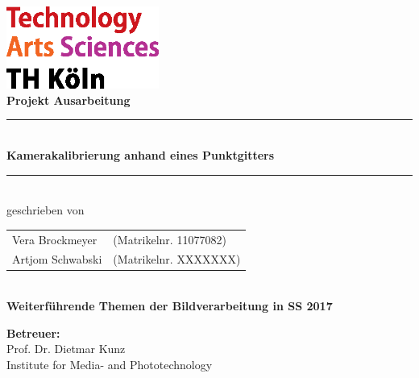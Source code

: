 \thispagestyle{empty}
\begin{center}
	\includegraphics[width=5cm]{Images/logo_TH}\\[12ex]
	{\Huge\textbf{Projekt Ausarbeitung}}\\[8ex]
	\rule{.8\textwidth}{.2pt}
	{\Large\\[1ex] \textbf{Kamerakalibrierung anhand eines Punktgitters }}\\
	\rule{.8\textwidth}{.2pt}\\[10ex]
	geschrieben von\\[2ex]
	\begin{tabular}{ll}
		Vera Brockmeyer &(Matrikelnr. 11077082)\\
		Artjom Schwabski &(Matrikelnr. XXXXXXX)\\
	\end{tabular}\\[10ex]
	\textbf{Weiterführende Themen der Bildverarbeitung in SS 2017}\\			
\end{center}
\vfill
\begin{flushleft}
	{\bf Betreuer:}\\
	Prof. Dr. Dietmar Kunz\\
	Institute for Media- and Phototechnology
\end{flushleft}
\newpage